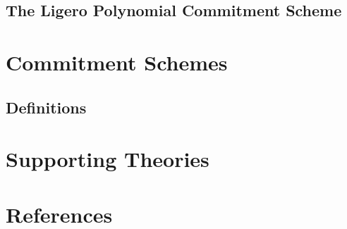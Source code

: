 \section{The Ligero Polynomial Commitment Scheme}

\chapter{Commitment Schemes}\label{chap:commitment_schemes}

\section{Definitions}





\chapter{Supporting Theories}\label{chap:supporting_theories}







\chapter{References}\label{chap:references}
